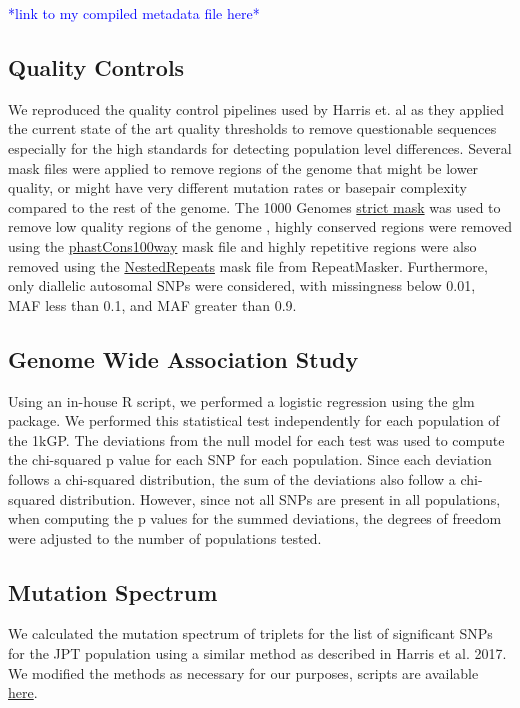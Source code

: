 \documentclass[9pt,lineno]{elife}
\newcommand{\todo}[1]{\textcolor{blue}{*#1*}}
\begin{document}
\todo{link to my compiled metadata file here}

\subsection{Quality Controls}
We reproduced the quality control pipelines used by Harris et. al as they applied the current state of the art quality thresholds to remove questionable sequences especially for the high standards for detecting population level differences. 
Several mask files were applied to remove regions of the genome that might be lower quality, or might have very different mutation rates or basepair complexity compared to the rest of the genome. 
The  1000 Genomes \href{http://ftp.1000genomes.ebi.ac.uk/vol1/ftp/release/20130502/supporting/accessible_genome_masks/20141020.strict_mask.whole_genome.bed}{strict mask} was used to remove low quality regions of the genome , highly conserved regions were removed using the \href{http://hgdownload.cse.ucsc.edu/goldenPath/hg19/database/phastConsElements100way.txt.gz}{phastCons100way} mask file and highly repetitive regions were also removed using the \href{http://hgdownload.cse.ucsc.edu/goldenpath/hg19/database/nestedRepeats.txt.gz}{NestedRepeats} mask file from RepeatMasker. 
Furthermore, only diallelic autosomal SNPs were considered, with missingness below 0.01, MAF less than 0.1, and MAF greater than 0.9.

\subsection{Genome Wide Association Study}
Using an in-house R script, we performed a logistic regression using the glm package. \cite{[R and GLM]} We performed this statistical test independently for each population of the 1kGP. The deviations from the null model for each test was used to compute the chi-squared p value for each SNP for each population. Since each deviation follows a chi-squared distribution, the sum of the deviations also follow a chi-squared distribution. However, since not all SNPs are present in all populations, when computing the p values for the summed deviations, the degrees of freedom were adjusted to the number of populations tested. 

\subsection{Mutation Spectrum}
We calculated the mutation spectrum of triplets for the list of significant SNPs for the JPT population using a similar method as described in Harris et al. 2017. \cite{Harris2017a}
We modified the methods as necessary for our purposes, scripts are available \href{https://github.com/LukeAndersonTrocme/QualityPaper}{here}. 
\end{document}
